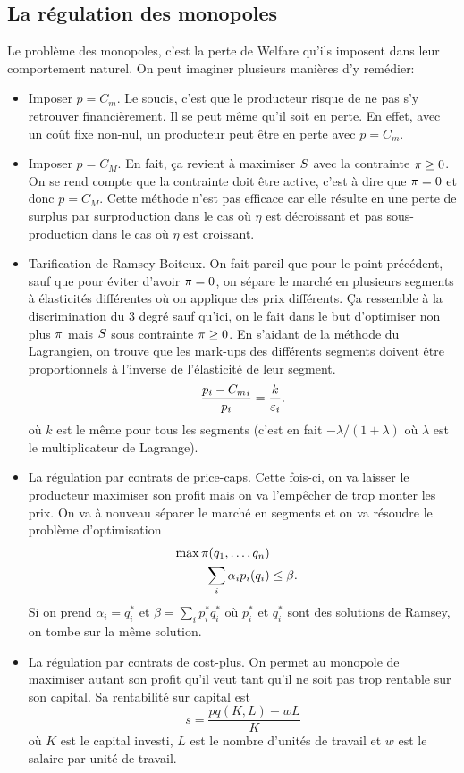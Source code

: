 \subsection{La régulation des monopoles}
Le problème des monopoles, c'est la perte de Welfare qu'ils imposent
dans leur comportement naturel.
On peut imaginer plusieurs manières d'y remédier:
\begin{itemize}
  \item Imposer $p = C_m$.
    Le soucis, c'est que le producteur risque de ne pas s'y retrouver
    financièrement. Il se peut même qu'il soit en perte.
    En effet, avec un coût fixe non-nul, un producteur peut être en perte
    avec $p = C_m$.
  \item Imposer $p = C_M$.
    En fait, ça revient à maximiser $S$ avec la contrainte
    $\pi \geq 0$.
    On se rend compte que la contrainte doit être active, c'est à dire que
    $\pi = 0$ et donc $p = C_M$. Cette méthode n'est pas
		efficace car elle résulte en une perte de surplus par
		surproduction dans le cas où $\eta$ est décroissant et
		pas sous-production dans le cas où $\eta$ est croissant.
  \item Tarification de Ramsey-Boiteux.
    On fait pareil que pour le point précédent, sauf que pour éviter
    d'avoir $\pi = 0$,
    on sépare le marché en plusieurs segments à élasticités différentes
    où on applique des prix différents.
    Ça ressemble à la discrimination du 3\ieme{} degré sauf qu'ici,
    on le fait dans le but d'optimiser non plus $\pi$ mais $S$
    sous contrainte $\pi \geq 0$.
    En s'aidant de la méthode du Lagrangien, on trouve que les
    mark-ups des différents segments doivent être proportionnels à l'inverse
    de l'élasticité de leur segment.
    \[ \frac{p_i - {C_m}_i}{p_i} = \frac{k}{\varepsilon_i}. \]
    où $k$ est le même pour tous les segments (c'est en fait
    $-\lambda/(1+\lambda)$ où $\lambda$ est le multiplicateur de Lagrange).
  \item La régulation par contrats de price-caps.
    Cette fois-ci, on va laisser le producteur maximiser son profit
    mais on va l'empêcher de trop monter les prix.
    On va à nouveau séparer le marché en segments et on va résoudre
    le problème d'optimisation
    \begin{align*}
      \max \pi(q_1,\ldots,q_n)\\
      \sum_i \alpha_ip_i(q_i) & \leq \beta.
    \end{align*}
    Si on prend $\alpha_i = q_i^*$ et $\beta = \sum_i p_i^*q_i^*$
    où $p_i^*$ et $q_i^*$ sont des solutions de Ramsey, on tombe
    sur la même solution.
  \item La régulation par contrats de cost-plus.
    On permet au monopole de maximiser autant son profit qu'il veut
    tant qu'il ne soit pas trop rentable sur son capital.
    Sa rentabilité sur capital est
    \[ s = \frac{pq(K, L) - wL}{K} \]
    où $K$ est le capital investi, $L$ est le nombre d'unités de travail
    et $w$ est le salaire par unité de travail.


\end{itemize}

